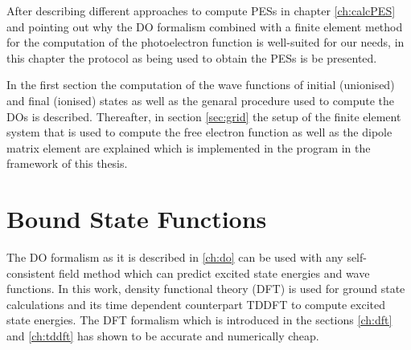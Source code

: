 \label{ch:proced}
After describing different approaches to compute PESs in chapter \ref{ch:calcPES} and pointing out why the DO formalism combined with a finite element method for the computation of the photoelectron function is well-suited for our needs, in this chapter the protocol as being used to obtain the PESs is be presented.

In the first section the computation of the wave functions of initial (unionised) and final (ionised) states as well as the genaral procedure used to compute the DOs is described.
Thereafter, in section \ref{sec:grid} the setup of the finite element system that is used to compute the free electron function as well as the dipole matrix element are explained which is implemented in the program  \cite{FreeWilly} in the framework of this thesis.

\section{Bound State Functions}
The DO formalism as it is described in \ref{ch:do} can be used with any self-consistent field method which can predict excited state energies and wave functions.
In this work,  density functional theory (DFT) is used for ground state calculations and its time dependent counterpart TDDFT to compute excited state energies.
The DFT formalism which is introduced in the sections \ref{ch:dft} and \ref{ch:tddft} has shown to be accurate and numerically cheap.

